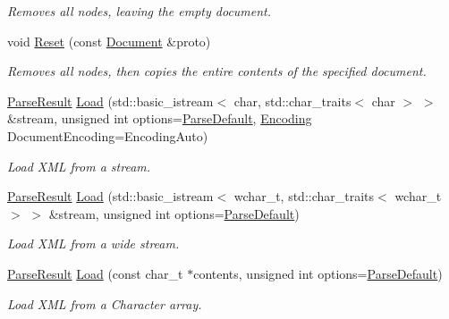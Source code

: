 \begin{DoxyCompactItemize}
\begin{DoxyCompactList}\small\item\em Removes all nodes, leaving the empty document. \item\end{DoxyCompactList}\item 
void \hyperlink{classphys_1_1xml_1_1Document_aba87e21330118fb43b2aab2c36486b03}{Reset} (const \hyperlink{classphys_1_1xml_1_1Document}{Document} \&proto)
\begin{DoxyCompactList}\small\item\em Removes all nodes, then copies the entire contents of the specified document. \item\end{DoxyCompactList}\item 
\hyperlink{structphys_1_1xml_1_1ParseResult}{ParseResult} \hyperlink{classphys_1_1xml_1_1Document_a9d4ddfd3b987fa3d31d41c06d06a001e}{Load} (std::basic\_\-istream$<$ char, std::char\_\-traits$<$ char $>$ $>$ \&stream, unsigned int options=\hyperlink{namespacephys_1_1xml_aa6b8f7f8c2322fd683a235b498834d60}{ParseDefault}, \hyperlink{namespacephys_1_1xml_a420f5de782438f88160321385bea2015}{Encoding} DocumentEncoding=EncodingAuto)
\begin{DoxyCompactList}\small\item\em Load XML from a stream. \item\end{DoxyCompactList}\item 
\hyperlink{structphys_1_1xml_1_1ParseResult}{ParseResult} \hyperlink{classphys_1_1xml_1_1Document_a5c31cda427eeeb61cd40932f7bec6376}{Load} (std::basic\_\-istream$<$ wchar\_\-t, std::char\_\-traits$<$ wchar\_\-t $>$ $>$ \&stream, unsigned int options=\hyperlink{namespacephys_1_1xml_aa6b8f7f8c2322fd683a235b498834d60}{ParseDefault})
\begin{DoxyCompactList}\small\item\em Load XML from a wide stream. \item\end{DoxyCompactList}\item 
\hyperlink{structphys_1_1xml_1_1ParseResult}{ParseResult} \hyperlink{classphys_1_1xml_1_1Document_a7ae98719610eefc5c05255e305c75e56}{Load} (const char\_\-t $\ast$contents, unsigned int options=\hyperlink{namespacephys_1_1xml_aa6b8f7f8c2322fd683a235b498834d60}{ParseDefault})
\begin{DoxyCompactList}\small\item\em Load XML from a Character array. \item\end{DoxyCompactList}\item 

\end{DoxyCompactItemize}
